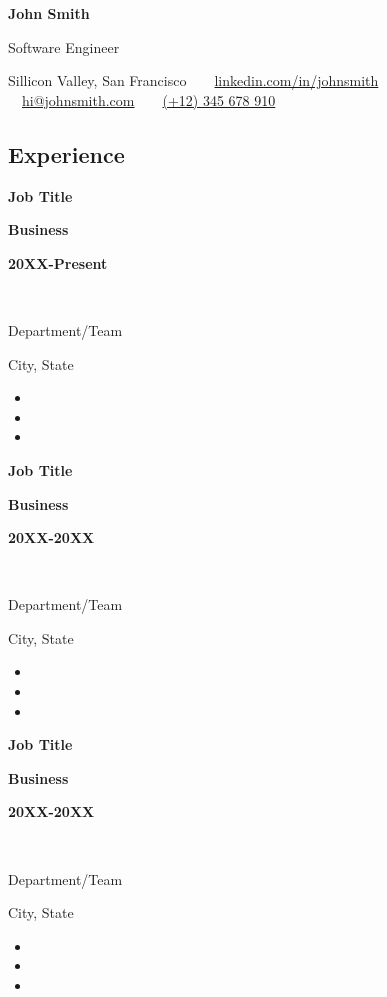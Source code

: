 \documentclass[10pt,a4paper]{article}
\newcommand\splitlinehalf[3][t]{%
  \parbox[#1]{\splitcolone\textwidth}{\raggedright#2}%
  \parbox[#1]{\splitcoltwo\textwidth}{\centering#3}%
}
\newcommand\splitlinethirds[4][t]{%
  \parbox[#1]{\splitcolone\textwidth}{\raggedright#2}%
  \parbox[#1]{\splitcoltwo\textwidth}{\centering#3}%
  \parbox[#1]{\splitcolthree\textwidth}{\raggedleft#4}%
}
\def \splitcolone {0.35}
\def \splitcoltwo {0.35}
\def \splitcolthree {0.3}
\begin{document}

\begin{center}
	{\LARGE \textbf{John Smith}}\vspace{0.2cm}
			
	{\large Software Engineer}\vspace{0.2cm}
			
	Sillicon Valley, San Francisco\ \ \textbullet \ \
	\href{https://linkedin.com/in/johnsmith}{linkedin.com/in/johnsmith} \textbullet \ \
	\href{mailto:hi@johnsmith.com}{hi@johnsmith.com}\ \ \textbullet \ \
	\href{tel:+12345678910}{(+12) 345 678 910} \ \
\end{center}

\lipsum[1][1-9]



\subsection*{\textcolor{accent}{\Large Experience  \sout{\hfill}}} 

\splitlinethirds{\textbf{Job Title}}{\textbf{Business}}{\textbf{20XX-Present}}\\
\splitlinehalf{Department/Team}{City, State}
\begin{itemize}
	\item \lipsum[1][1-2]
	\item \lipsum[1][2-3]
	\item \lipsum[1][4-6]
\end{itemize}

\splitlinethirds{\textbf{Job Title}}{\textbf{Business}}{\textbf{20XX-20XX}}\\
\splitlinehalf{Department/Team}{City, State}
\begin{itemize}
	\item \lipsum[2][1-2]
	\item \lipsum[2][2-3]
	\item \lipsum[2][4-6]
\end{itemize}

\splitlinethirds{\textbf{Job Title}}{\textbf{Business}}{\textbf{20XX-20XX}}\\
\splitlinehalf{Department/Team}{City, State}
\begin{itemize}
	\item \lipsum[3][1-2]
	\item \lipsum[3][2-3]
	\item \lipsum[3][4-6]
\end{itemize}
\end{document}
